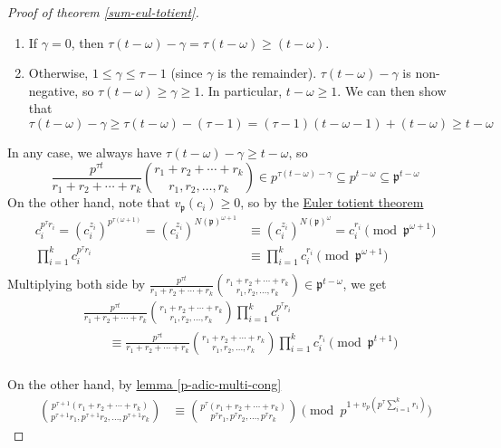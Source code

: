 \documentclass{treatise}
\begin{document}
\begin{proof}[Proof of theorem \ref*{sum-eul-totient}]
\begin{enumerate}
	\item If $\gamma = 0$, then $\tau (t - \omega) - \gamma = \tau (t - \omega) \geq (t - \omega)$.
	\item Otherwise, $1 \leq \gamma \leq \tau - 1$ (since $\gamma$ is the remainder). $\tau (t - \omega) - \gamma$ is non-negative, so $\tau (t - \omega) \geq \gamma \geq 1$. In particular, $t - \omega \geq 1$. We can then show that
	$$\tau (t - \omega) - \gamma \geq \tau (t - \omega) - (\tau - 1) = (\tau - 1)(t - \omega - 1) + (t - \omega) \geq t - \omega$$
\end{enumerate}
In any case, we always have $\tau (t - \omega) - \gamma \geq t - \omega$, so 
$$\frac{p^{\tau t}}{r_1 + r_2 + \cdots + r_k} {r_1 + r_2 + \cdots + r_k \choose r_1, r_2, \hdots, r_k} \in p^{\tau (t - \omega) - \gamma} \subseteq p^{t - \omega} \subseteq \mathfrak{p}^{t - \omega}$$
On the other hand, note that $v_\mathfrak{p}(c_i) \geq 0$, so by the \hyperref[eul-totient-thm]{Euler totient theorem}
\begin{align*}
c_i^{p^\tau r_i} = (c_i^{z_i})^{p^{\tau(\omega + 1)}} = (c_i^{z_i})^{N(\mathfrak{p})^{\omega + 1}} & \equiv (c_i^{z_i})^{N(\mathfrak{p})^\omega} = c_i^{r_i} \pmod{\mathfrak{p}^{\omega + 1}} \\
\prod_{i = 1}^k c_i^{p^\tau r_i} & \equiv \prod_{i = 1}^k c_i^{r_i} \pmod{\mathfrak{p}^{\omega + 1}} \\
\end{align*}
Multiplying both side by $\frac{p^{\tau t}}{r_1 + r_2 + \cdots + r_k} {r_1 + r_2 + \cdots + r_k \choose r_1, r_2, \hdots, r_k} \in \mathfrak{p}^{t - \omega}$, we get
\begin{align} \label{1st-term-cong}
& \frac{p^{\tau t}}{r_1 + r_2 + \cdots + r_k} {r_1 + r_2 + \cdots + r_k \choose r_1, r_2, \hdots, r_k} \prod_{i = 1}^k c_i^{p^\tau r_i} \nonumber
\\
& \qquad \equiv \frac{p^{\tau t}}{r_1 + r_2 + \cdots + r_k} {r_1 + r_2 + \cdots + r_k \choose r_1, r_2, \hdots, r_k} \prod_{i = 1}^k c_i^{r_i} \pmod{\mathfrak{p}^{t + 1}}
\end{align}
\\
On the other hand, by \hyperref[p-adic-multi-cong]{lemma \ref*{p-adic-multi-cong}}
\begin{align*}
{p^{\tau + 1}(r_1 + r_2 + \cdots + r_k) \choose p^{\tau + 1} r_1, p^{\tau + 1} r_2, \hdots, p^{\tau + 1} r_k} & \equiv {p^\tau(r_1 + r_2 + \cdots + r_k) \choose p^\tau r_1, p^\tau r_2, \hdots, p^\tau r_k} \pmod{p^{1 + v_p \left( p^\tau \sum_{i = 1}^k r_i \right)}}

\end{align*}
\end{proof}
\end{document}
